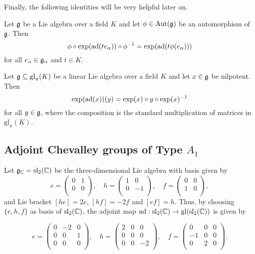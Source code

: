 Finally, the following identities will be very helpful later on.
\begin{lemma}
    Let $\mathfrak{g}$ be a Lie algebra over a field $K$ and let $\phi\in\mathrm{Aut}(\mathfrak{g})$ be an automorphism of $\mathfrak{g}$. Then
    $$\phi\circ\exp(\mathrm{ad}(te_\alpha))\circ\phi^{-1}=\exp(\mathrm{ad}(t\phi(e_\alpha)))$$
    for all $e_\alpha\in\mathfrak{g}_\alpha$ and $t\in K$.
\end{lemma}

\begin{lemma}\label{lem:identityexp}
    Let $\mathfrak{g}\subseteq\mathrm{gl}_n(K)$ be a linear Lie algebra over a field $K$ and let $x\in\mathfrak{g}$ be nilpotent. Then 
    $$\exp(\mathrm{ad}(x))(y)=\exp(x)\circ y\circ \exp(x)^{-1}$$
    for all $y\in\mathfrak{g}$, where the composition is the standard multiplication of matrices in $\mathrm{gl}_n(K)$.
\end{lemma}

\subsection{Adjoint Chevalley groups of Type $A_1$}

Let $\mathfrak{g}_{\mathbb{C}}=\mathrm{sl}_2(\mathbb{C})$ be the three-dimensional Lie algebra with basis given by
$$e=\begin{pmatrix}
    0 & 1\\
    0 & 0\\
\end{pmatrix},\quad h=\begin{pmatrix}
    1 & 0\\
    0 & -1\\
\end{pmatrix},\quad f=\begin{pmatrix}
    0 & 0\\
    1 & 0\\
\end{pmatrix},$$
and Lie bracket $[he]=2e$, $[hf]=-2f$ and $[ef]=h$. Thus, by choosing $\{e,h,f\}$ as basis of $\mathrm{sl}_2(\mathbb{C})$, the adjoint map $\mathrm{ad}:\mathrm{sl}_2(\mathbb{C})\to\mathrm{gl}(\mathrm{sl}_2(\mathbb{C}))$ is given by 

$$e=\begin{pmatrix}
    0 & -2 & 0\\
    0 & 0 & 1\\
    0 & 0 & 0\\
\end{pmatrix},\quad h=\begin{pmatrix}
    2 & 0 & 0\\
    0 & 0 & 0\\
    0 & 0 & -2\\
\end{pmatrix},\quad f=\begin{pmatrix}
    0 & 0 & 0\\
    -1 & 0 & 0\\
    0 & 2 & 0\\
\end{pmatrix}.$$


